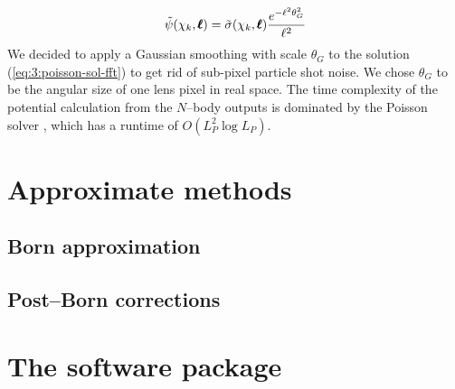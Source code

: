 \begin{equation}
\label{eq:3:poisson-sol-fft}
\tilde{\psi}(\chi_k,\pmb{\ell}) = \tilde{\sigma}(\chi_k,\pmb{\ell})\frac{e^{-\ell^2\theta_G^2}}{\ell^2}
\end{equation} 
%
We decided to apply a Gaussian smoothing with scale $\theta_G$ to the solution (\ref{eq:3:poisson-sol-fft}) to get rid of sub-pixel particle shot noise. We chose $\theta_G$ to be the angular size of one lens pixel in real space. The time complexity of the potential calculation from the $N$--body outputs is dominated by the Poisson solver \citep{lenstools}, which has a runtime of $O(L_P^2\log L_P)$.  

\section{Approximate methods}

\subsection{Born approximation}

\subsection{Post--Born corrections}

\section{The \LT software package}

